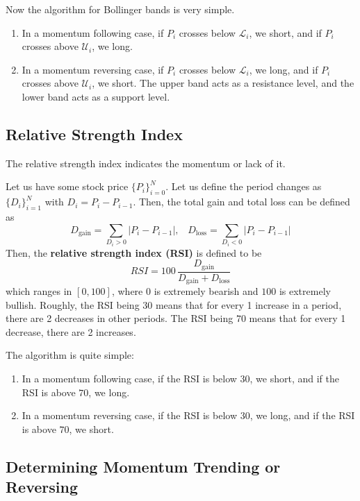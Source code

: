 \documentclass{article}
\begin{document}
    Now the algorithm for Bollinger bands is very simple. 
    \begin{enumerate}
      \item In a momentum following case, if $P_i$ crosses below $\mathcal{L}_i$, we short, and if $P_i$ crosses above $\mathcal{U}_i$, we long. 

      \item In a momentum reversing case, if $P_i$ crosses below $\mathcal{L}_i$, we long, and if $P_i$ crosses above $\mathcal{U}_i$, we short. The upper band acts as a resistance level, and the lower band acts as a support level. 
    \end{enumerate}

  \subsection{Relative Strength Index}

    The relative strength index indicates the momentum or lack of it. 

    \begin{definition}
      Let us have some stock price $\{P_i\}_{i=0}^N$. Let us define the period changes as $\{D_i\}_{i=1}^N$ with $D_i = P_i - P_{i-1}$. Then, the total gain and total loss can be defined as 
      \[D_\mathrm{gain} = \sum_{D_i > 0} |P_i - P_{i-1}|, \;\;\; D_{\mathrm{loss}} = \sum_{D_i < 0} |P_i - P_{i-1}|\]
      Then, the \textbf{relative strength index (RSI)} is defined to be 
      \[RSI = 100 \, \frac{D_{\mathrm{gain}}}{D_\mathrm{gain} + D_{\mathrm{loss}}}\]
      which ranges in $[0, 100]$, where $0$ is extremely bearish and $100$ is extremely bullish. Roughly, the RSI being $30$ means that for every 1 increase in a period, there are 2 decreases in other periods. The RSI being $70$ means that for every 1 decrease, there are 2 increases. 
    \end{definition}

    The algorithm is quite simple: 
    \begin{enumerate}
      \item In a momentum following case, if the RSI is below $30$, we short, and if the RSI is above $70$, we long. 
      \item In a momentum reversing case, if the RSI is below $30$, we long, and if the RSI is above $70$, we short. 
    \end{enumerate}

  \subsection{Determining Momentum Trending or Reversing}
\end{document}
